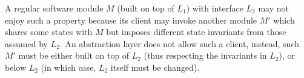 {%

A regular software module $M$ (built on top of $L_1$) with interface
$L_2$ may not enjoy such a property because its client may invoke
another module $M'$ which shares some states with $M$ but imposes
different state invariants from those assumed by $L_2$. An abstraction
layer does not allow such a client, instead, such $M'$ must be either built
on top of $L_2$ (thus respecting the invariants in $L_2$), or below
$L_2$ (in which case, $L_2$ itself must be changed).

%
%

}
